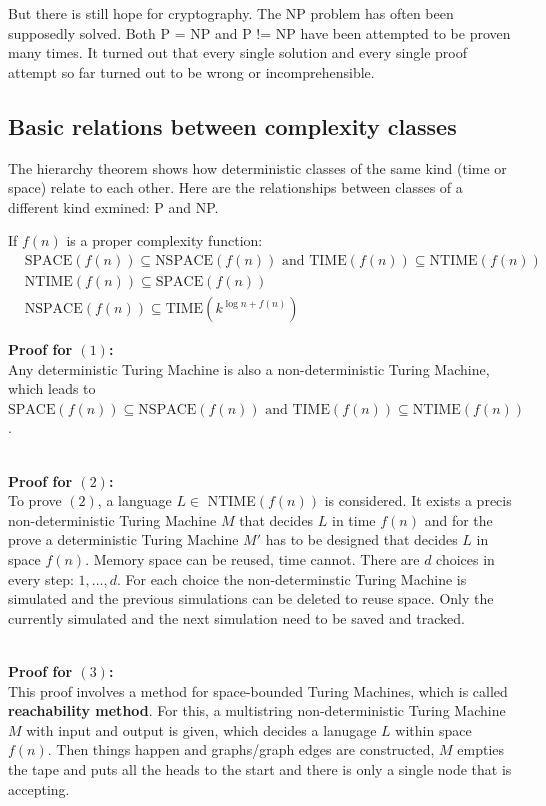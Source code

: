 \documentclass[a4]{scrartcl}
\begin{document}
But there is still hope for cryptography. The NP problem has often been supposedly solved. Both P = NP and P != NP have been attempted to be proven many times. It turned out that every single solution and every single proof attempt so far turned out to be wrong or incomprehensible. \cite{DD, book, GTI}






\subsection*{Basic relations between complexity classes}


The hierarchy theorem shows how deterministic classes of the same kind (time or space) relate to each other.
Here are the relationships between classes of a different kind exmined: P and NP.

If $f(n)$ is a proper complexity function:
\begin{align}
& \text{SPACE}(f(n)) \subseteq \text{NSPACE}(f(n)) \text{ and TIME}(f(n)) \subseteq \text{NTIME}(f(n)) \\
& \text{NTIME}(f(n)) \subseteq \text{SPACE}(f(n)) \\
& \text{NSPACE}(f(n)) \subseteq \text{TIME}(k^{\log n + f(n)}) 
\end{align}

\textbf{Proof for $(1)$:} \\
Any deterministic Turing Machine is also a non-deterministic Turing Machine, which leads to $\text{SPACE}(f(n)) \subseteq \text{NSPACE}(f(n)) \text{ and TIME}(f(n)) \subseteq \text{NTIME}(f(n))$.

\ \\
\textbf{Proof for $(2)$:} \\
To prove $(2)$, a language $L \in $ NTIME$(f(n))$ is considered. It exists a precis non-deterministic Turing Machine $M$ that decides $L$ in time $f(n)$ and for the prove a deterministic Turing Machine $M'$ has to be designed that decides $L$ in space $f(n)$.
Memory space can be reused, time cannot.
There are $d$ choices in every step: $1,...,d$. For each choice the non-determinstic Turing Machine is simulated and the previous simulations can be deleted to reuse space. Only the currently simulated and the next simulation need to be saved and tracked.


\ \\
\textbf{Proof for $(3)$:} \\
This proof involves a method for space-bounded Turing Machines, which is called \textbf{reachability method}.
For this, a multistring non-deterministic Turing Machine $M$ with input and output is given, which decides a lanugage $L$ within space $f(n)$.
Then things happen and graphs/graph edges are constructed, $M$ empties the tape and puts all the heads to the start and there is only a single node that is accepting.
\end{document}
